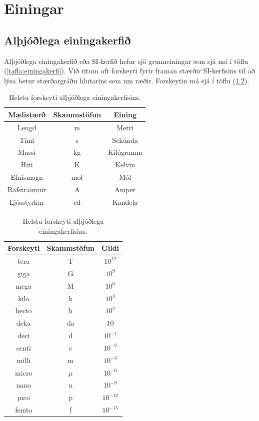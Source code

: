 
\chapter{Einingar}

\section{Alþjóðlega einingakerfið}

Alþjóðlega einingakerfið eða SI-kerfið hefur sjö grunneiningar sem sjá má í töflu (\ref{tafla:einingakerfi}). Við ritum oft forskeyti fyrir framan stærðir SI-kerfisins til að lýsa betur stærðargráðu hlutarins sem um ræðir. Forskeytin má sjá í töflu (\ref{tafla:forskeyti}).


\begin{table}[H]
\centering
\begin{minipage}[t]{0.5\linewidth}
\centering

\begin{tabular}{|c|c|c|}
\hline
\textbf{Mælistærð} & \textbf{Skammstöfun} & \textbf{Eining} \\
\hline
Lengd & m & Metri \\
Tími & s & Sekúnda \\
Massi & kg & Kílógramm  \\
Hiti & K  & Kelvin \\
Efnismagn & mol & Mól \\
Rafstraumur  & A    & Amper  \\
Ljósstyrkur  & cd & Kandela \\
\hline
\end{tabular}
\caption{Grunneiningar alþjóðlega einingakerfisins.}
\label{tafla:einingakerfi}
\end{minipage}\hfill
\begin{minipage}[t]{0.5\linewidth}
\centering
\begin{tabular}{|c|c|c|}
\hline
\textbf{Forskeyti} & \textbf{Skammstöfun} & \textbf{Gildi} \\
\hline
tera & T & $10^{12}$ \\
giga & G & $10^9$ \\
mega & M & $10^6$  \\
kilo & k  & $10^3$ \\
hecto & h & $10^2$ \\
deka  & da    & $10$  \\
deci  & d & $10^{-1}$ \\
centi  & c & $10^{-2}$ \\
milli  & m & $10^{-3}$ \\
micro  & $\mu$ & $10^{-6}$ \\
nano  & n & $10^{-9}$ \\
pico  & p & $10^{-12}$ \\
femto  & f & $10^{-15}$ \\
\hline
\end{tabular}
\caption{Helstu forskeyti alþjóðlega einingakerfisins.}
\label{tafla:forskeyti}
\end{minipage}
\end{table}


